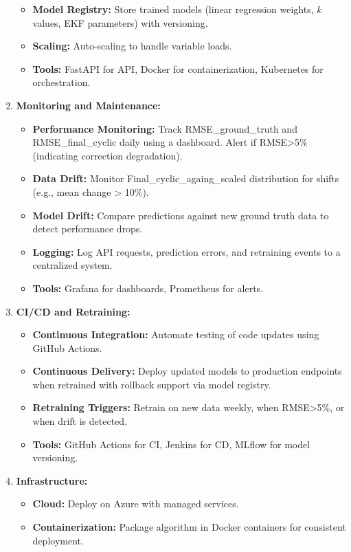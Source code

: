 \begin{enumerate}
\begin{itemize}
        \item \textbf{Model Registry:} Store trained models (linear regression weights, $k$ values, EKF parameters) with versioning.
        \item \textbf{Scaling:} Auto-scaling to handle variable loads.
        \item \textbf{Tools:} FastAPI for API, Docker for containerization, Kubernetes for orchestration.
    \end{itemize}
    \item \textbf{Monitoring and Maintenance:} \begin{itemize}
        \item \textbf{Performance Monitoring:} Track RMSE\_ground\_truth and \\ RMSE\_final\_cyclic daily using a dashboard. Alert if RMSE>5\% (indicating correction degradation).
        \item \textbf{Data Drift:} Monitor Final\_cyclic\_againg\_scaled distribution for shifts (e.g., mean change > 10\%).
        \item \textbf{Model Drift:} Compare predictions against new ground truth data to detect performance drops.
        \item \textbf{Logging:} Log API requests, prediction errors, and retraining events to a centralized system.
        \item \textbf{Tools:} Grafana for dashboards, Prometheus for alerts.
    \end{itemize}
    \item \textbf{CI/CD and Retraining:}\begin{itemize}
        \item \textbf{Continuous Integration:} Automate testing of code updates using GitHub Actions.
        \item \textbf{Continuous Delivery:} Deploy updated models to production endpoints when retrained with rollback support via model registry.
        \item \textbf{Retraining Triggers:} Retrain on new data weekly, when RMSE>5\%, or when drift is detected.
        \item \textbf{Tools:} GitHub Actions for CI, Jenkins for CD, MLflow for model versioning.
    \end{itemize}
    \item \textbf{Infrastructure:} \begin{itemize}
        \item \textbf{Cloud:} Deploy on Azure with managed services.
        \item \textbf{Containerization:} Package algorithm in Docker containers for consistent deployment.

\end{itemize}
\end{enumerate}

